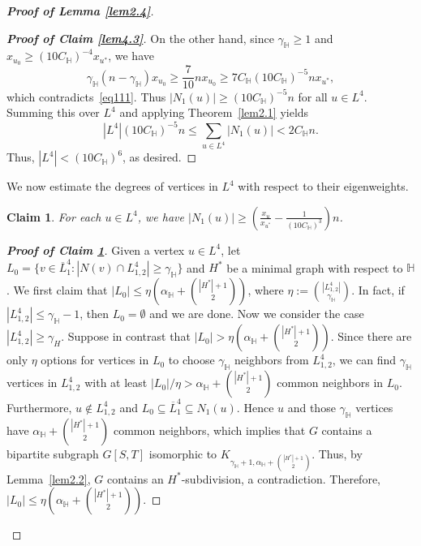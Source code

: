 \documentclass[11pt, a4paper]{article}
\newtheorem{claim}[theorem]{Claim}
\theoremstyle{definition}
\newcommand{\<}{\subseteq}
\begin{document}
\begin{proof}[\bf Proof of Lemma \ref{lem2.4}]
\begin{proof}[\bf Proof of Claim \ref{lem4.3}]
    On the other hand, since \( \gamma_\mathbb{H} \geq 1 \) and \( x_{u_0} \geq (10C_\mathbb{H})^{-4}x_{u^*} \), we have
    \[
    \gamma_\mathbb{H}(n-\gamma_\mathbb{H})x_{u_0} \geq \frac{7}{10}nx_{u_0} \geq 7C_\mathbb{H}(10C_\mathbb{H})^{-5}nx_{u^*},
    \]
    which contradicts~\eqref{eq111}. Thus \( |N_1(u)| \geq (10C_\mathbb{H})^{-5}n \) for all \( u \in L^4 \).
    Summing this over \( L^4 \) and applying Theorem~\ref{lem2.1} yields 
    \[
    |L^4|(10C_\mathbb{H})^{-5}n \leq \sum_{u \in L^4} |N_1(u)| < 2C_\mathbb{H}n.
    \]
    Thus,  $|L^4| < (10C_\mathbb{H})^6$, as desired.
\end{proof}
  We now estimate the degrees of vertices in $L^4$
  with respect to their eigenweights.%
\begin{claim}\label{lem4.4}
    For each \( u \in L^4 \), we have 
    $|N_1(u)| \geq \left(\frac{x_u}{x_{u^*}} - \frac{1}{(10C_\mathbb{H})^3}\right)n$.
    \end{claim}

\begin{proof}[\bf Proof of Claim \ref{lem4.4}]
    Given a vertex $u\in L^4$, let $L_0=\{v\in \overline{L}_1^4: |N(v)\cap L_{1,2}^4|\geq \gamma_{\mathbb{H}}\}$ and $H^*$ be a minimal  graph with respect to $\mathbb{H}$. %
    We first claim that %
    $|L_0|\leq \eta(\alpha_\mathbb{H}+\binom{|H^*|+1}{2})$, where $\eta:=\binom
    {|L_{1,2}^4|}{\gamma_\mathbb{H}}$.
    In fact, if $|L_{1,2}^4|\leq \gamma_\mathbb{H}-1$, then $L_0=\emptyset$ and we are done.
    Now we  consider the case $|L_{1,2}^4|\geq\gamma_H$.
    Suppose in contrast that $|L_0|>\eta(\alpha_\mathbb{\mathbb{H}}+\binom{|H^*|+1}{2})$.
    Since there are only $\eta$ options for vertices in $L_0$ to choose $\gamma_\mathbb{H}$ neighbors from $L_{1,2}^4$, we can find $\gamma_\mathbb{H}$ vertices in $L_{1,2}^4$ with at least $|L_0|/\eta>\alpha_\mathbb{H}+\binom{|H^*|+1}{2}$ common neighbors in $L_0$.
    Furthermore, $u\notin L_{1,2}^4$ and $L_0\subseteq \overline{L}_1^4\subseteq N_1(u)$.
    Hence $u$ and those $\gamma_\mathbb{H}$ vertices have $\alpha_\mathbb{H}+\binom{|H^*|+1}{2}$ common neighbors, which implies that $G$ contains a bipartite subgraph $G[S,T]$ isomorphic to $K_{\gamma_\mathbb{H}+1,\alpha_\mathbb{H}+\binom{|H^*|+1}{2}}$. Thus, by Lemma~\ref{lem2.2}, $G$ contains an $H^*$-subdivision, a contradiction. 
    Therefore, $|L_0|\leq \eta(\alpha_\mathbb{H}+\binom{|H^*|+1}{2})$.
    

\end{proof}
\end{proof}
\end{document}
